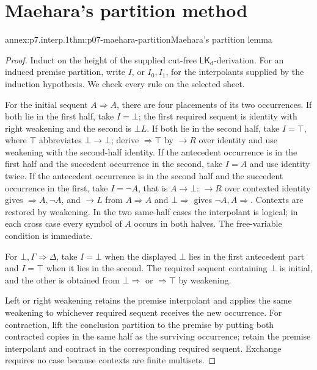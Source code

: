 
\section{Maehara's partition method}

\begin{annexitem}{annex:p7.interp.1}{thm:p07-maehara-partition}{Maehara's partition lemma}
\begin{proof}
Induct on the height of the supplied cut-free
\(\mathsf{LK}_{\mathrm d}\)-derivation.  For an induced premise partition,
write \(I\), or \(I_0,I_1\), for the interpolants supplied by the induction
hypothesis.  We check every rule on the selected sheet.

For the initial sequent \(A\Rightarrow A\), there are four placements of its
two occurrences.  If both lie in the first half, take \(I=\bot\); the first
required sequent is identity with right weakening and the second is
\(\bot L\).  If both lie in the second half, take
\(I=\top\), where \(\top\) abbreviates \(\bot\to\bot\); derive
\(\Rightarrow\top\) by \(\to R\) over identity and use weakening with the
second-half identity.  If the antecedent occurrence is in the first half and
the succedent occurrence in the second, take \(I=A\) and use identity twice.
If the antecedent occurrence is in the second half and the succedent occurrence
in the first, take \(I=\neg A\), that is \(A\to\bot\): \(\to R\) over
contexted identity gives \(\Rightarrow A,\neg A\), and \(\to L\) from
\(A\Rightarrow A\) and \(\bot\Rightarrow\) gives
\(\neg A,A\Rightarrow\).  Contexts are restored by weakening.  In the two
same-half cases the interpolant is logical; in each cross case every symbol of
\(A\) occurs in both halves.  The free-variable condition is immediate.

For \(\bot,\Gamma\Rightarrow\Delta\), take \(I=\bot\) when the displayed
\(\bot\) lies in the first antecedent part and \(I=\top\) when it lies in the
second.  The required sequent containing \(\bot\) is initial, and the other is
obtained from \(\bot\Rightarrow\) or \(\Rightarrow\top\) by weakening.

Left or right weakening retains the premise interpolant and applies the same
weakening to whichever required sequent receives the new occurrence.
For contraction, lift the conclusion partition to the premise by putting both
contracted copies in the same half as the surviving occurrence; retain the
premise interpolant and contract in the corresponding required sequent.
Exchange requires no case because contexts are finite multisets.


\end{proof}
\end{annexitem}
